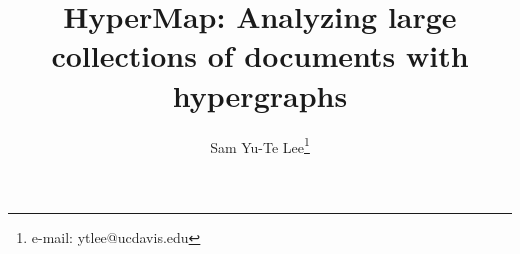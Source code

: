 \documentclass[review]{vgtc}                 %
\title{HyperMap: Analyzing large collections of documents with hypergraphs}
\author{ Sam Yu-Te Lee\thanks{e-mail: ytlee@ucdavis.edu}\\ %
}
\affiliation{\scriptsize University of California, Davis}
\begin{document}


\maketitle













%

%
%
%



\pagebreak
\appendix %


\end{document}
